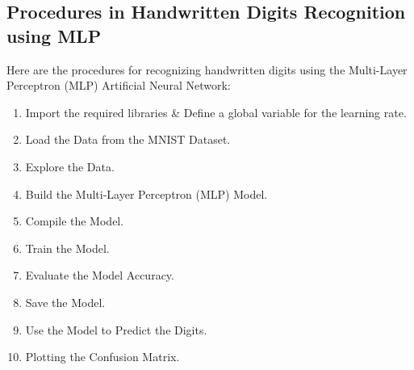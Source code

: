 \documentclass{book}
\begin{document}
\subsection{Procedures in Handwritten Digits Recognition using MLP}
Here are the procedures for recognizing handwritten digits using the Multi-Layer Perceptron (MLP) Artificial Neural Network:
\begin{enumerate}
    \item Import the required libraries \& Define a global variable for the learning rate.
    \item Load the Data from the MNIST Dataset.
    \item Explore the Data.
    \item Build the Multi-Layer Perceptron (MLP) Model.
    \item Compile the Model.
    \item Train the Model.
    \item Evaluate the Model Accuracy.
    \item Save the Model.
    \item Use the Model to Predict the Digits.
    \item Plotting the Confusion Matrix.
\end{enumerate}
\end{document}
